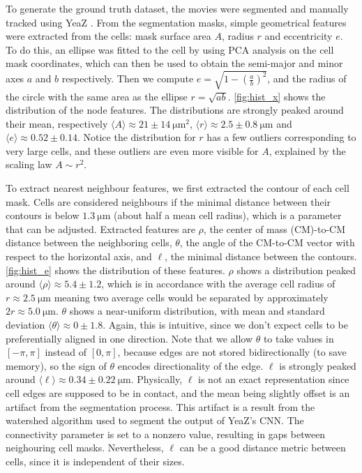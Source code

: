 \documentclass[10pt,conference,compsocconf,a4paper]{IEEEtran}
\newcommand{\nunit}[1]{\ \si{#1}}  %
\newcommand{\avg}[1]{\langle{#1}\rangle}
\newcommand*{\shortautoref}[1]{%
	\begingroup
	\def\equationautorefname{\textsc{Eq.}}%
	\def\tableautorefname{\textsc{Tab.}}%
	\def\figureautorefname{\textsc{Fig.}}%
	\autoref{#1}%
	\endgroup
}
\begin{document}
		To generate the ground truth dataset, the movies were segmented and manually tracked using YeaZ \cite{dietler_convolutional_2020}. From the segmentation masks, simple geometrical features were extracted from the cells: mask surface area $A$, radius $r$ and eccentricity $e$. To do this, an ellipse was fitted to the cell by using PCA analysis on the cell mask coordinates, which can then be used to obtain the semi-major and minor axes $a$ and $b$ respectively. Then we compute $e=\sqrt{1-(\frac{a}{b})^2}$, and the radius of the circle with the same area as the ellipse $r=\sqrt{ab}$. \shortautoref{fig:hist_x} shows the distribution of the node features. The distributions are strongly peaked around their mean, respectively $\avg{A} \approx 21 \pm 14 \nunit{\micro \meter \squared}$, $\avg{r} \approx 2.5 \pm 0.8 \nunit{\micro \meter}$ and $\avg{e} \approx 0.52 \pm 0.14$. Notice the distribution for $r$ has a few outliers corresponding to very large cells, and these outliers are even more visible for $A$, explained by the scaling law $A \sim r^2$.

		To extract nearest neighbour features, we first extracted the contour of each cell mask. Cells are considered neighbours if the minimal distance between their contours is below $1.3 \nunit{\micro \meter}$ (about half a mean cell radius), which is a parameter that can be adjusted.
		Extracted features are $\rho$, the center of mass (CM)-to-CM distance between the neighboring cells, $\theta$, the angle of the CM-to-CM vector with respect to the horizontal axis, and $\ell$, the minimal distance between the contours. \shortautoref{fig:hist_e} shows the distribution of these features. $\rho$ shows a distribution peaked around $\avg{\rho} \approx 5.4 \pm 1.2$, which is in accordance with the average cell radius of $r \approx 2.5 \nunit{\micro \meter}$ meaning two average cells would be separated by approximately $2r \approx 5.0 \nunit{\micro \meter}$. $\theta$ shows a near-uniform distribution, with mean and standard deviation $\avg{\theta} \approx 0 \pm 1.8$. Again, this is intuitive, since we don't expect cells to be preferentially aligned in one direction. Note that we allow $\theta$ to take values in $[-\pi, \pi]$ instead of $[0, \pi]$, because edges are not stored bidirectionally (to save memory), so the sign of $\theta$ encodes directionality of the edge. $\ell$ is strongly peaked around $\avg{\ell} \approx 0.34 \pm 0.22 \nunit{\micro \meter}$. Physically, $\ell$ is not an exact representation since cell edges are supposed to be in contact, and the mean being slightly offset is an artifact from the segmentation process.
		This artifact is a result from the watershed algorithm used to segment the output of YeaZ's CNN. The connectivity parameter is set to a nonzero value, resulting in gaps between neighouring cell masks.
		Nevertheless, $\ell$ can be a good distance metric between cells, since it is independent of their sizes.
\end{document}
